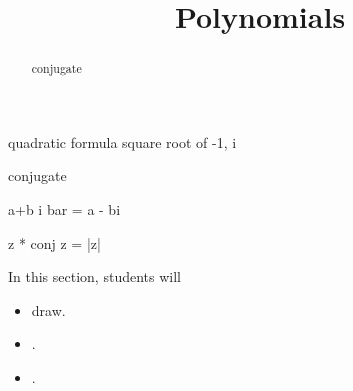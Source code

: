 \documentclass{ximera}
\title{Polynomials}
\begin{document}
\begin{abstract}
conjugate
\end{abstract}
\maketitle



quadratic formula square root of -1, i




conjugate

a+b i bar = a - bi

z * conj z = |z|



















\begin{sectionOutcomes}
In this section, students will 

\begin{itemize}
\item draw.
\item .
\item .
\end{itemize}
\end{sectionOutcomes}
\end{document}
